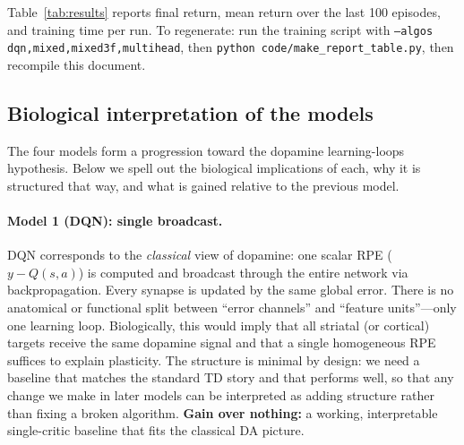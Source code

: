 \documentclass[11pt]{article}
\begin{document}
Table~\ref{tab:results} reports final return, mean return over the last 100 episodes, and training time per run. To regenerate: run the training script with \texttt{--algos dqn,mixed,mixed3f,multihead}, then \texttt{python code/make\_report\_table.py}, then recompile this document.



\subsection{Biological interpretation of the models}

The four models form a progression toward the dopamine learning-loops hypothesis. Below we spell out the biological implications of each, why it is structured that way, and what is gained relative to the previous model.

\paragraph{Model 1 (DQN): single broadcast.} DQN corresponds to the \emph{classical} view of dopamine: one scalar RPE ($y - Q(s,a)$) is computed and broadcast through the entire network via backpropagation. Every synapse is updated by the same global error. There is no anatomical or functional split between ``error channels'' and ``feature units''---only one learning loop. Biologically, this would imply that all striatal (or cortical) targets receive the same dopamine signal and that a single homogeneous RPE suffices to explain plasticity. The structure is minimal by design: we need a baseline that matches the standard TD story and that performs well, so that any change we make in later models can be interpreted as adding structure rather than fixing a broken algorithm. \textbf{Gain over nothing:} a working, interpretable single-critic baseline that fits the classical DA picture.
\end{document}
